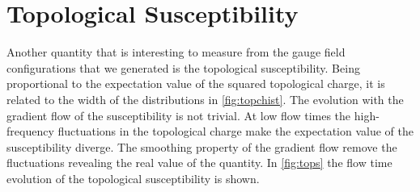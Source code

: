 \section{Topological Susceptibility}
Another quantity that is interesting to measure from the gauge field configurations that we generated is the topological susceptibility. Being proportional to the expectation value of the squared topological charge, it is related to the width of the distributions in \cref{fig:topchist}. The evolution with the gradient flow of the susceptibility is not trivial. At low flow times the high-frequency fluctuations in the topological charge make the expectation value of the susceptibility diverge. The smoothing property of the gradient flow remove the fluctuations revealing the real value of the quantity. In \cref{fig:tops} the flow time evolution of the topological susceptibility is shown.

